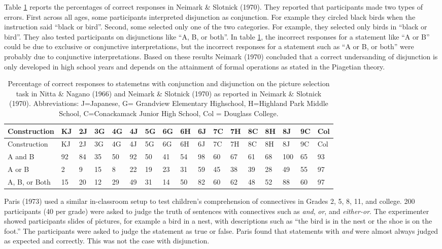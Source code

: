 \documentclass[oneside]{report}
\theoremstyle{definition}
\theoremstyle{definition}
\theoremstyle{definition}
\theoremstyle{remark}
\begin{document}
Table \ref{tab:NeimarkTable} reports the percentages of correct
responses in Neimark \& Slotnick (1970). They reported that participants
made two types of errors. First across all ages, some participants
interpreted disjunction as conjunction. For example they circled black
birds when the instruction said ``black or bird''. Second, some selected
only one of the two categories. For example, they selected only birds in
``black or bird''. They also tested participants on disjunctions like
``A, B, or both''. In table \ref{tab:NeimarkTable}, the incorrect
responses for a statement like ``A or B'' could be due to exclusive or
conjunctive interpretations, but the incorrect responses for a statement
such as ``A or B, or both'' were probably due to conjunctive
interpretations. Based on these results Neimark (1970) concluded that a
correct undersanding of disjunction is only developed in high school
years and depends on the attainment of formal operations as stated in
the Piagetian theory.
\begin{longtable}[]{@{}lllllllllllllllll@{}}
\caption{\label{tab:NeimarkTable} Percentage of correct responses to
statemetns with conjunction and disjunction on the picture selection
task in Nitta \& Nagano (1966) and Neimark \& Slotnick (1970) as
reported in Neimark \& Slotnick (1970). Abbreviations: J=Japanese, G=
Grandview Elementary Highschool, H=Highland Park Middle School,
C=Conackamack Junior High School, Col = Douglass
College.}\tabularnewline
\toprule
Construction & KJ & 2J & 3G & 4G & 4J & 5G & 6G & 6H & 6J & 7C & 7H & 8C
& 8H & 8J & 9C & Col\tabularnewline
\midrule
\endfirsthead
\toprule
Construction & KJ & 2J & 3G & 4G & 4J & 5G & 6G & 6H & 6J & 7C & 7H & 8C
& 8H & 8J & 9C & Col\tabularnewline
\midrule
\endhead
A and B & 92 & 84 & 35 & 50 & 92 & 50 & 41 & 54 & 98 & 60 & 67 & 61 & 68
& 100 & 65 & 93\tabularnewline
A or B & 2 & 9 & 15 & 8 & 22 & 19 & 23 & 31 & 59 & 45 & 38 & 39 & 28 &
49 & 55 & 97\tabularnewline
A, B, or Both & 15 & 20 & 12 & 29 & 49 & 31 & 14 & 50 & 82 & 60 & 62 &
48 & 52 & 88 & 60 & 97\tabularnewline
\bottomrule
\end{longtable}
Paris (1973) used a similar in-classroom setup to test children's
comprehension of connectives in Grades 2, 5, 8, 11, and college. 200
participants (40 per grade) were asked to judge the truth of sentences
with connectives such as \emph{and}, \emph{or}, and \emph{either-or}.
The experimenter showed participants slides of pictures, for example a
bird in a nest, with descriptions such as ``the bird is in the nest or
the shoe is on the foot.'' The participants were asked to judge the
statement as true or false. Paris found that statements with \emph{and}
were almost always judged as expected and correctly. This was not the
case with disjunction.
\end{document}
